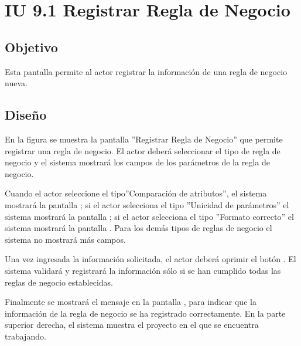 \section{IU 9.1 Registrar Regla de Negocio}

\subsection{Objetivo}
	Esta pantalla permite al actor registrar la información de una regla de negocio nueva.
\subsection{Diseño}
	En la figura  se muestra la pantalla ''Registrar Regla de Negocio'' que permite registrar una regla de negocio. El actor deberá seleccionar el tipo de regla de negocio y el sistema mostrará los campos de los parámetros de la regla de negocio.
	
	Cuando el actor seleccione el tipo''Comparación de atributos'', el sistema mostrará la pantalla ; si el actor selecciona el tipo ''Unicidad de parámetros'' el sistema mostrará la pantalla ; si el actor selecciona el tipo ''Formato correcto'' el sistema mostrará la pantalla . Para los demás tipos de reglas de negocio el sistema no mostrará más campos.
	
	Una vez ingresada la información solicitada, el actor deberá oprimir el botón . El sistema validará y registrará la información sólo si se han cumplido todas las reglas de negocio establecidas.
	
	Finalmente se mostrará el mensaje  en la pantalla , para indicar que la información de la regla de negocio se ha registrado correctamente.
	En la parte superior derecha, el sistema muestra el proyecto en el que se encuentra trabajando.

